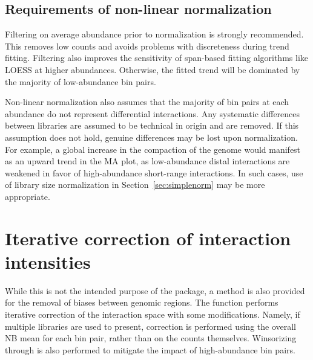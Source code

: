 \documentclass{report}\usepackage[]{graphicx}\usepackage[usenames,dvipsnames]{color}
\newcommand{\hlnum}[1]{\textcolor[rgb]{0.816,0.125,0.439}{#1}}%
\newcommand{\hlopt}[1]{\textcolor[rgb]{0,0,0}{#1}}%
\newcommand{\hlstd}[1]{\textcolor[rgb]{0.251,0.251,0.251}{#1}}%
\newcommand{\hlkwb}[1]{\textcolor[rgb]{0,0,0}{#1}}%
\newcommand{\hlkwc}[1]{\textcolor[rgb]{0.251,0.251,0.251}{#1}}%
\newcommand{\hlkwd}[1]{\textcolor[rgb]{0.878,0.439,0.125}{#1}}%
\newenvironment{knitrout}{}{} %
\begin{document}
\subsection{Requirements of non-linear normalization}
Filtering on average abundance prior to normalization is strongly recommended.
This removes low counts and avoids problems with discreteness during trend fitting.
Filtering also improves the sensitivity of span-based fitting algorithms like LOESS at higher abundances.
Otherwise, the fitted trend will be dominated by the majority of low-abundance bin pairs.

Non-linear normalization also assumes that the majority of bin pairs at each abundance do not represent differential interactions.
Any systematic differences between libraries are assumed to be technical in origin and are removed.
If this assumption does not hold, genuine differences may be lost upon normalization.
For example, a global increase in the compaction of the genome would manifest as an upward trend in the MA plot, as low-abundance distal interactions are weakened in favor of high-abundance short-range interactions.
In such cases, use of library size normalization in Section~\ref{sec:simplenorm} may be more appropriate.

\section{Iterative correction of interaction intensities}
\label{sec:itercor}
While this is not the intended purpose of the  package, a method is also provided for the removal of biases between genomic regions.
The  function performs iterative correction of the interaction space \cite{imakaev2012iterative} with some modifications.
Namely, if multiple libraries are used to present, correction is performed using the overall NB mean for each bin pair, rather than on the counts themselves.
Winsorizing through  is also performed to mitigate the impact of high-abundance bin pairs.

\begin{knitrout}
\color{fgcolor}
\end{knitrout}
\end{document}
